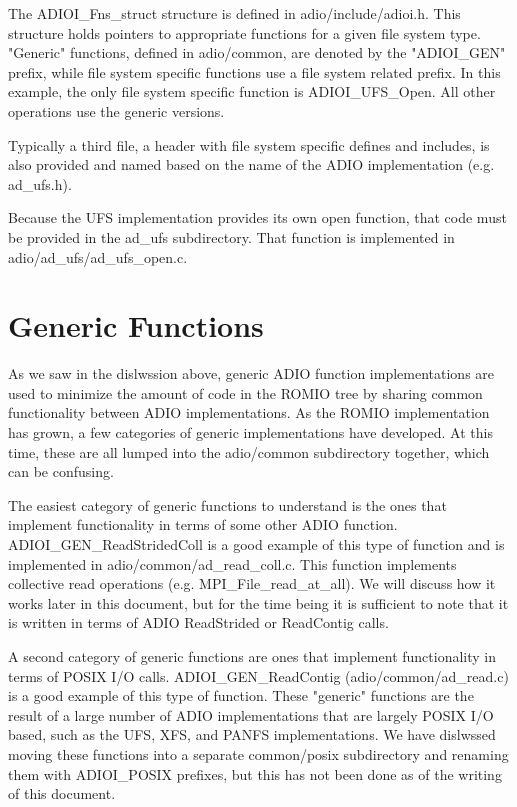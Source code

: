The ADIOI\_Fns\_struct structure is defined in adio/include/adioi.h.  This
structure holds pointers to appropriate functions for a given file system
type.  "Generic" functions, defined in adio/common, are denoted by the
"ADIOI\_GEN" prefix, while file system specific functions use a file system
related prefix.  In this example, the only file system specific function is
ADIOI\_UFS\_Open.  All other operations use the generic versions.

Typically a third file, a header with file system specific defines and
includes, is also provided and named based on the name of the ADIO
implementation (e.g. ad\_ufs.h).

Because the UFS implementation provides its own open function, that code must be provided in the ad\_ufs subdirectory.  That function is implemented in adio/ad\_ufs/ad\_ufs\_open.c.

\section{Generic Functions}

As we saw in the dislwssion above, generic ADIO function implementations are
used to minimize the amount of code in the ROMIO tree by sharing common
functionality between ADIO implementations.  As the ROMIO implementation has
grown, a few categories of generic implementations have developed.  At this
time, these are all lumped into the adio/common subdirectory together, which
can be confusing.

The easiest category of generic functions to understand is the ones that
implement functionality in terms of some other ADIO function.
ADIOI\_GEN\_ReadStridedColl is a good example of this type of function and is
implemented in adio/common/ad\_read\_coll.c.  This function implements
collective read operations (e.g. MPI\_File\_read\_at\_all).  We will discuss how
it works later in this document, but for the time being it is sufficient to
note that it is written in terms of ADIO ReadStrided or ReadContig calls.

A second category of generic functions are ones that implement functionality
in terms of POSIX I/O calls.  ADIOI\_GEN\_ReadContig (adio/common/ad\_read.c) is
a good example of this type of function.  These "generic" functions are the
result of a large number of ADIO implementations that are largely POSIX I/O
based, such as the UFS, XFS, and PANFS implementations.  We have dislwssed
moving these functions into a separate common/posix subdirectory and renaming
them with ADIOI\_POSIX prefixes, but this has not been done as of the writing
of this document.

